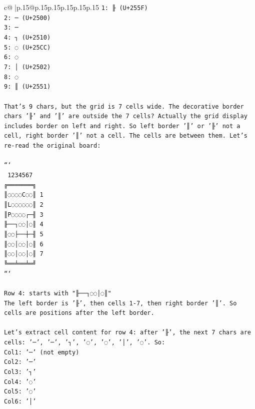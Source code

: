 \documentclass{article}
\begin{document}
{\begin{supertabular}{c@{$\;$}|p{.15\linewidth}@{}p{.15\linewidth}p{.15\linewidth}p{.15\linewidth}p{.15\linewidth}p{.15\linewidth}}
{{{\texttt{1: ╟ (U+255F)} \\
\texttt{2: ─ (U+2500)} \\
\texttt{3: ─} \\
\texttt{4: ┐ (U+2510)} \\
\texttt{5: ◌ (U+25CC)} \\
\texttt{6: ◌} \\
\texttt{7: │ (U+2502)} \\
\texttt{8: ◌} \\
\texttt{9: ║ (U+2551)} \\
\\ 
\texttt{That’s 9 chars, but the grid is 7 cells wide. The decorative border chars '╟' and '║' are outside the 7 cells? Actually the grid display includes border on left and right. So left border '║' or '╟' not a cell, right border '║' not a cell. The cells are between them. Let's re{-}read the original board:} \\
\\ 
\texttt{```} \\
\texttt{ 1234567} \\
\texttt{╔═══════╗} \\
\texttt{║◌◌◌◌C◌◌║ 1} \\
\texttt{║L◌◌◌◌◌◌║ 2} \\
\texttt{║P◌◌◌◌┌─╢ 3} \\
\texttt{╟──┐◌◌│◌║ 4} \\
\texttt{║◌◌├──┼─╢ 5} \\
\texttt{║◌◌│◌◌│◌║ 6} \\
\texttt{║◌◌│◌◌│◌║ 7} \\
\texttt{╚══╧══╧═╝} \\
\texttt{```} \\
\\ 
\texttt{Row 4: starts with "╟──┐◌◌│◌║"} \\
\texttt{The left border is '╟', then cells 1{-}7, then right border '║'. So cells are positions after the left border.} \\
\\ 
\texttt{Let's extract cell content for row 4: after '╟', the next 7 chars are cells: '─', '─', '┐', '◌', '◌', '│', '◌'. So:} \\
\texttt{Col1: '─' (not empty)} \\
\texttt{Col2: '─'} \\
\texttt{Col3: '┐'} \\
\texttt{Col4: '◌'} \\
\texttt{Col5: '◌'} \\
\texttt{Col6: '│'} \\
}}}
\end{supertabular}}
\end{document}
